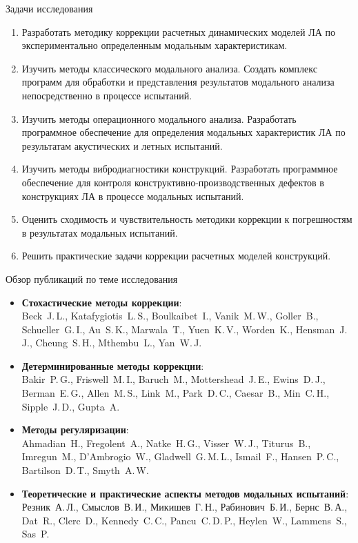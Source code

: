 \begin{frame}{Задачи исследования}
	\begin{enumerate}
		\item Разработать методику коррекции расчетных динамических моделей ЛА по экспериментально определенным модальным характеристикам.
		\item Изучить методы классического модального анализа. Создать комплекс программ для обработки и представления результатов модального анализа непосредственно в процессе испытаний.
		\item Изучить методы операционного модального анализа. Разработать программное обеспечение для определения модальных характеристик ЛА по результатам акустических и летных испытаний.
		\item Изучить методы вибродиагностики конструкций. Разработать программное обеспечение для контроля конструктивно-производственных дефектов в конструкциях ЛА в процессе модальных испытаний.
		\item Оценить сходимость и чувствительность методики коррекции к погрешностям в результатах модальных испытаний.
		\item Решить практические задачи коррекции расчетных моделей конструкций.
	\end{enumerate}
\end{frame}

\begin{frame}{Обзор публикаций по теме исследования}
	\begin{itemize}
		\item \textbf{Стохастические методы коррекции}: \\ Beck~J.\,L., Katafygiotis~L.\,S., Boulkaibet~I., Vanik~M.\,W., Goller~B., Schueller~G.\,I., Au~S.\,K., Marwala~T., Yuen~K.\,V., Worden~K., Hensman~J.\,J., Cheung~S.\,H., Mthembu~L., Yan~W.\,J.
		\item \textbf{Детерминированные методы коррекции}: \\ Bakir~P.\,G., Friswell~M.\,I., Baruch~M., Mottershead~J.\,E., Ewins~D.\,J., Berman~E.\,G., Allen~M.\,S., Link~M., Park~D.\,C., Caesar~B., Min~C.\,H., Sipple~J.\,D., Gupta~A.
		\item \textbf{Методы регуляризации}: \\ Ahmadian~H., Fregolent~A., Natke~H.\,G., Visser~W.\,J., Titurus~B., Imregun~M., D'Ambrogio~W., Gladwell~G.\,M.\,L., Ismail~F., Hansen~P.\,C., Bartilson~D.\,T., Smyth~A.\,W.
		\item \textbf{Теоретические и практические аспекты методов модальных испытаний}: \\ Резник~А.\,Л., Смыслов~В.\,И., Микишев~Г.\,Н., Рабинович~Б.\,И., Бернс~В.\,А., Dat~R., Clerc~D., Kennedy~C.\,C., Pancu~C.\,D.\,P., Heylen~W., Lammens~S., Sas~P.
	\end{itemize}
\end{frame}

